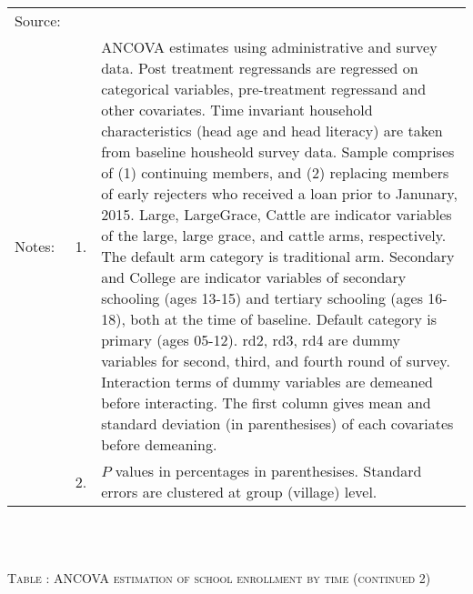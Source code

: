 \begin{minipage}[t]{14cm}
\begin{tabular}{>{\hfill\scriptsize}p{1cm}<{}>{\hfill\scriptsize}p{.25cm}<{}>{\scriptsize}p{12cm}<{\hfill}}
Source:& \multicolumn{2}{l}{\scriptsize Estimated with GUK administrative and survey data.}\\
Notes: & 1. & ANCOVA estimates using administrative and survey data. Post treatment regressands are regressed on categorical variables, pre-treatment regressand and other covariates. Time invariant household characteristics (head age and head literacy) are taken from baseline housheold survey data. Sample comprises of (1) continuing members, and (2) replacing members of early rejecters who received a loan prior to Janunary, 2015.  \textsf{Large}, \textsf{LargeGrace}, \textsf{Cattle} are indicator variables of the \textsf{large}, \textsf{large grace}, and \textsf{cattle} arms, respectively. The default arm category is \textsf{traditional} arm. \textsf{Secondary} and \textsf{College} are indicator variables of secondary schooling (ages 13-15) and tertiary schooling (ages 16-18), both at the time of baseline. Default category is primary (ages 05-12). \textsf{rd2, rd3, rd4} are dummy variables for second, third, and fourth round of survey. Interaction terms of dummy variables are demeaned before interacting. The first column gives mean and standard deviation (in parenthesises) of each covariates before demeaning. \\
& 2. & $P$ values in percentages in parenthesises. Standard errors are clustered at group (village) level. %
 \end{tabular}
\end{minipage} \\\\\hspace{-1cm}\begin{minipage}[t]{14cm} \hfil\textsc{\normalsize Table \thetable: ANCOVA estimation of school enrollment by time (continued 2)\label{tab ANCOVA enroll time varying3}}\\ \setlength{\tabcolsep}{1pt}
  \setlength{\baselineskip}{8pt}
  \renewcommand{\arraystretch}{.55}
  \hfil{}\\
\renewcommand{\arraystretch}{.8}
\setlength{\tabcolsep}{1pt} \begin{tabular}{>{\hfill\scriptsize}p{1cm}<{}>{\hfill\scriptsize}p{.25cm}<{}>{\scriptsize}p{12cm}<{\hfill}} 

\end{tabular}
\end{minipage}
